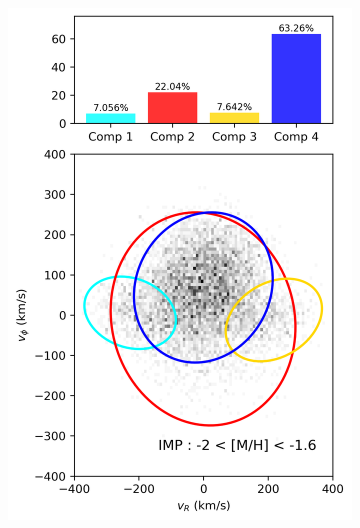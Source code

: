 \documentclass[a4paper,12pt]{article}
\begin{document}
\begin{figure}[h]
\begin{subfigure}[t]{0.24\textwidth}
        \includegraphics[width=\linewidth]{../figures/gmm_IMP.png}
    \end{subfigure}
    \hfill
    \begin{subfigure}[t]{0.24\textwidth}
        \centering

\end{subfigure}
\end{figure}
\end{document}
